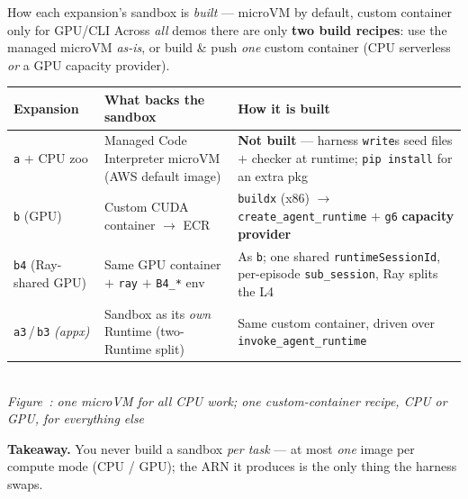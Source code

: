 \documentclass[aspectratio=169]{beamer}
\newcounter{deckfig}
\newcommand{\figtag}[1]{\refstepcounter{deckfig}%
  {\scriptsize\itshape Figure~\thedeckfig: #1}}
\begin{document}
\begin{frame}{How each expansion's sandbox is \emph{built} --- microVM by default, custom container only for GPU/CLI}
  \footnotesize Across \emph{all} demos there are only \textbf{two build recipes}: use the managed
  microVM \emph{as-is}, or build \& push \emph{one} custom container (CPU serverless \emph{or} a GPU
  capacity provider).
  \begin{center}
  \renewcommand{\arraystretch}{0.45}\scriptsize
  \begin{tabular}{@{}p{2.5cm}p{4.0cm}p{5.0cm}@{}}
    \toprule
    \textbf{Expansion} & \textbf{What backs the sandbox} & \textbf{How it is built} \\
    \midrule
    \texttt{a} $+$ CPU zoo & Managed Code Interpreter microVM (AWS default image) & \textbf{Not built} --- harness \texttt{write}s seed files $+$ checker at runtime; \texttt{pip install} for an extra pkg \\
    \texttt{b} (GPU) & Custom CUDA container $\to$ ECR & \texttt{buildx} (x86) $\to$ \texttt{create\_agent\_runtime} $+$ \texttt{g6} \textbf{capacity provider} \\
    \texttt{b4} (Ray-shared GPU) & Same GPU container $+$ \texttt{ray} $+$ \texttt{B4\_*} env & As \texttt{b}; one shared \texttt{runtimeSessionId}, per-episode \texttt{sub\_session}, Ray splits the L4 \\
    \texttt{a3}\,/\,\texttt{b3} \emph{(appx)} & Sandbox as its \emph{own} Runtime (two-Runtime split) & Same custom container, driven over \texttt{invoke\_agent\_runtime} \\
    \bottomrule
  \end{tabular}
  \\[0.1em]\figtag{one microVM for all CPU work; one custom-container recipe, CPU or GPU, for everything else}
  \end{center}
  \vspace{-0.3em}
  {\scriptsize\textbf{Takeaway.} You never build a sandbox \emph{per task} --- at most \emph{one} image
  per compute mode (CPU / GPU); the ARN it produces is the only thing the harness swaps.}
\end{frame}
\end{document}
